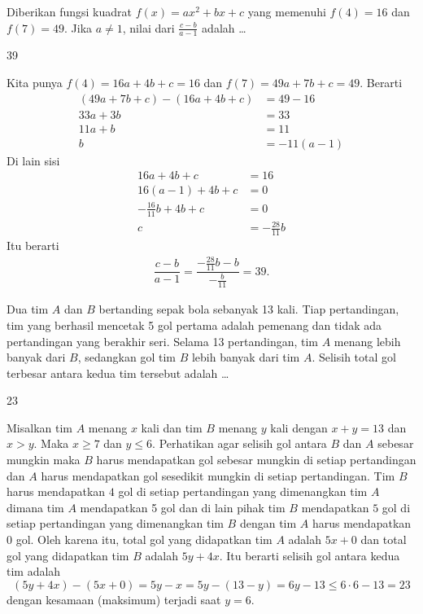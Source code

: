 \documentclass[12pt]{scrartcl}
\begin{document}
\begin{soalbaru}
Diberikan fungsi kuadrat  $f(x) = ax^2+bx+c$ yang memenuhi $f(4)=16$ dan $f(7)=49$. Jika $a \neq 1$, nilai dari $\frac{c-b}{a-1}$ adalah \dots
\end{soalbaru}
\begin{jawaban}
39
\end{jawaban}
\begin{solusi}
Kita punya $f(4)=16a+4b+c=16$ dan $f(7)=49a+7b+c=49$. Berarti 
\begin{align*}
(49a+7b+c)-(16a+4b+c)&=49-16\\
33a+3b &= 33\\
11a+b &= 11\\
b &= -11(a-1)
\end{align*}
Di lain sisi
\begin{align*}
16a+4b+c&=16\\
16(a-1) + 4b + c &= 0\\
-\frac{16}{11}b + 4b + c &= 0\\
c &= -\frac{28}{11}b
\end{align*}
Itu berarti 
\begin{align*}
\dfrac{c-b}{a-1} = \dfrac{-\frac{28}{11}b-b}{-\frac{b}{11}}=\boxed{39}.
\end{align*}
\end{solusi}

\begin{soalbaru}
Dua tim $A$ dan $B$ bertanding sepak bola sebanyak 13 kali. Tiap pertandingan, tim yang berhasil mencetak 5 gol pertama adalah pemenang dan tidak ada pertandingan yang berakhir seri. Selama 13 pertandingan, tim $A$ menang lebih banyak dari $B$, sedangkan gol tim $B$ lebih banyak dari tim $A$. Selisih total gol terbesar antara kedua tim tersebut adalah \dots
\end{soalbaru}
\begin{jawaban}
23
\end{jawaban}
\begin{solusi}
Misalkan tim $A$ menang $x$ kali dan tim $B$ menang $y$ kali dengan $x+y=13$ dan $x>y$. Maka $x \ge 7$ dan $y  \le 6$. Perhatikan agar selisih gol antara $B$ dan $A$ sebesar mungkin maka $B$ harus mendapatkan gol sebesar mungkin di setiap pertandingan dan $A$ harus mendapatkan gol sesedikit mungkin di setiap pertandingan. Tim $B$ harus mendapatkan $4$ gol di setiap pertandingan yang dimenangkan tim $A$ dimana tim $A$ mendapatkan 5 gol dan di lain pihak tim $B$ mendapatkan $5$ gol di setiap pertandingan yang dimenangkan tim $B$ dengan tim $A$ harus mendapatkan $0$ gol. Oleh karena itu, total gol yang didapatkan tim $A$ adalah $5x+0$ dan total gol yang didapatkan tim $B$ adalah $5y+4x$. Itu berarti selisih gol antara kedua tim adalah
$$(5y+4x)-(5x+0) = 5y-x = 5y - (13-y) = 6y - 13 \le 6 \cdot 6 - 13 = \boxed{23}$$
dengan kesamaan (maksimum) terjadi saat $y=6$.
\end{solusi}
\end{document}
